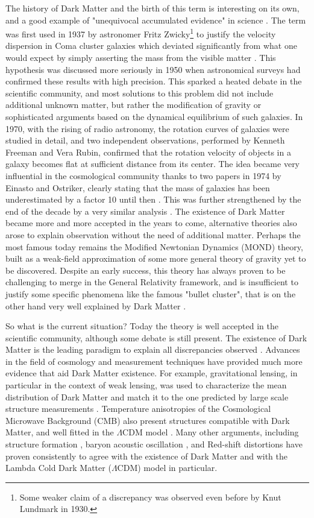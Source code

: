 The history of Dark Matter and the birth of this term is interesting on its own, and a good example of "unequivocal accumulated evidence" in science \cite{hooper, deSwart:2017heh}. The term was first used in 1937 by astronomer Fritz Zwicky\footnote{Some weaker claim of a discrepancy was observed even before by Knut Lundmark in 1930.} to justify the velocity dispersion in Coma cluster galaxies which deviated significantly from what one would expect by simply asserting the mass from the visible matter \cite{1933AcHPh...6..110Z}. This hypothesis was discussed more seriously in 1950 when astronomical surveys had confirmed these results with high precision. This sparked a heated debate in the scientific community, and most solutions to this problem did not include additional unknown matter, but rather the modification of gravity or  sophisticated arguments based on the dynamical equilibrium of such galaxies. In 1970, with the rising of radio astronomy, the rotation curves of galaxies were studied in detail, and two independent observations, performed by Kenneth Freeman and Vera Rubin, confirmed that the rotation velocity of objects in a galaxy becomes flat at sufficient distance from its center. The idea became very influential in the cosmological community thanks to two papers in 1974 by Einasto and Ostriker, clearly stating that the mass of galaxies has been underestimated by a factor 10 until then \cite{EINASTO1974,1974ApJ...193L...1O}. This was further strengthened by the end of the decade by a very similar analysis \cite{annurev.aa.17.090179.001031}. The existence of Dark Matter became more and more accepted in the years to come, alternative theories also arose to explain observation without the need of additional matter. Perhaps the most famous today remains the Modified Newtonian Dynamics (MOND) theory, built as a weak-field approximation of some more general theory of gravity yet to be discovered. Despite an early success, this theory has always proven to be challenging to merge in the General Relativity framework, and is insufficient to justify some specific phenomena like the famous "bullet cluster", that is on the other hand very well explained by Dark Matter \cite{Clowe_2006}.

So what is the current situation? Today the theory is well accepted in the scientific community, although some debate is still present. The existence of Dark Matter is the leading paradigm to explain all discrepancies observed \cite{hooper}. Advances in the field of cosmology and measurement techniques have provided much more evidence that aid Dark Matter existence. For example, gravitational lensing, in particular in the context of weak lensing, was used to characterize the mean distribution of Dark Matter and match it to the one predicted by large scale structure measurements \cite{weak-lensing}. Temperature anisotropies of the Cosmological Microwave Background (CMB) also present structures compatible with Dark Matter, and well fitted in the $\Lambda$CDM model \cite{Ade:2015xua}. Many other arguments, including structure formation \cite{Navarro:1995iw}, baryon acoustic oscillation \cite{bao}, and Red-shift distortions \cite{Peacock2001} have proven consistently to agree with the existence of Dark Matter and with the Lambda Cold Dark Matter ($\Lambda$CDM) model in particular.


